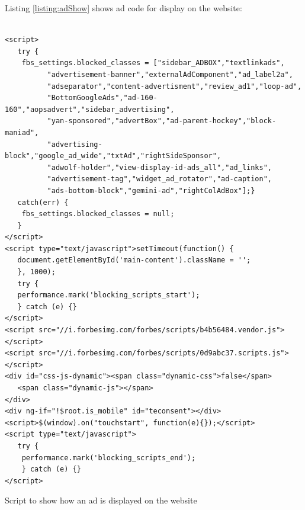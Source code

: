 \documentclass[runningheads,a4paper]{llncs}
\begin{document}
Listing \ref{listing:adShow} shows ad code for display on the website:
\begin{listing}[!h]
\begin{verbatim}
               
<script>
   try {
   	fbs_settings.blocked_classes = ["sidebar_ADBOX","textlinkads",
          "advertisement-banner","externalAdComponent","ad_label2a",
          "adseparator","content-advertisment","review_ad1","loop-ad",
          "BottomGoogleAds","ad-160-160","aopsadvert","sidebar_advertising",
          "yan-sponsored","advertBox","ad-parent-hockey","block-maniad",
          "advertising-block","google_ad_wide","txtAd","rightSideSponsor",
          "adwolf-holder","view-display-id-ads_all","ad_links",
          "advertisement-tag","widget_ad_rotator","ad-caption",
          "ads-bottom-block","gemini-ad","rightColAdBox"];} 
   catch(err) {
   	fbs_settings.blocked_classes = null;
   }
</script>
<script type="text/javascript">setTimeout(function() {
   document.getElementById('main-content').className = '';
   }, 1000);
   try {
   performance.mark('blocking_scripts_start');
   } catch (e) {}
</script>
<script src="//i.forbesimg.com/forbes/scripts/b4b56484.vendor.js"></script>
<script src="//i.forbesimg.com/forbes/scripts/0d9abc37.scripts.js"></script>
<div id="css-js-dynamic"><span class="dynamic-css">false</span>
   <span class="dynamic-js"></span>
</div>
<div ng-if="!$root.is_mobile" id="teconsent"></div>
<script>$(window).on("touchstart", function(e){});</script>
<script type="text/javascript">
   try {
   	performance.mark('blocking_scripts_end');
   	} catch (e) {}
</script>
\end{verbatim}
\caption{Script to show how an ad is displayed on the website}
\label{listing:adShow}
\end{listing}
\end{document}

